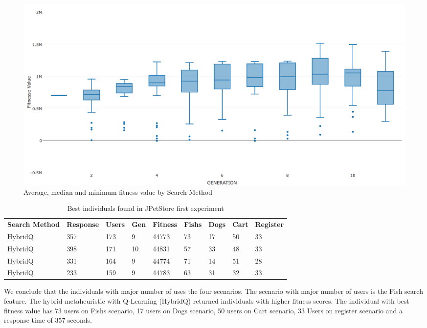 \begin{figure}[h]
\centering
\includegraphics[width=1\textwidth]{./images/experiment3-5.png}
\caption{Average, median and minimum fitness value by Search Method }
\label{fig:summaryboxplot3}
\end{figure}




\begin{table}[h!]
\centering
\caption{Best individuals found in JPetStore first experiment}
\label{tab:bestindividuals3}
\begin{tabular}{lllllllll}
\rowcolor[HTML]{C0C0C0} 
\textbf{Search Method} & \textbf{Response} & \textbf{Users} & \textbf{Gen} & \textbf{Fitness} & \textbf{Fishs} & \textbf{Dogs} & \textbf{Cart} & \textbf{Register} \\
HybridQ                & 357               & 173            & 9            & 44773            & 73             & 17            & 50            & 33                \\
HybridQ                & 398               & 171            & 10           & 44831            & 57             & 33            & 48            & 33                \\
HybridQ                & 331               & 164            & 9            & 44774            & 71             & 14            & 51            & 28                \\
HybridQ                & 233               & 159            & 9            & 44783            & 63             & 31            & 32            & 33               
\end{tabular}
\end{table}

We conclude that the individuals with major number of uses the four scenarios. The scenario with major number of users is the Fish search feature. The hybrid metaheuristic with Q-Learning (HybridQ) returned individuals with higher fitness scores.  The individual with best fitness value has 73 users on Fishs scenario, 17 users on Dogs scenario, 50 users on Cart scenario, 33 Users on register scenario  and a response time of 357 seconds. 
